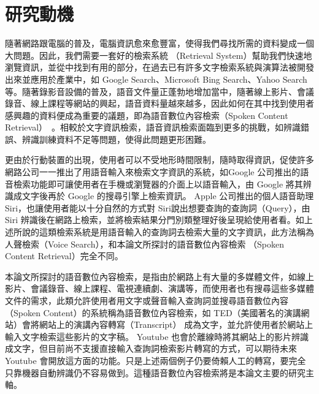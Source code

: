 \section{研究動機}
隨著網路跟電腦的普及，電腦資訊愈來愈豐富，使得我們尋找所需的資料變成一個大問題。因此，我們需要一套好的檢索系統
（Retrieval System）幫助我們快速地瀏覽資訊，並從中找到有用的部分，在過去已有許多文字檢索系統與演算法被開發出來並應用於產業中，如 Google Search、Microsoft Bing Search、Yahoo
Search等。隨著錄影音設備的普及，語音文件量正蓬勃地增加當中，隨著線上影片、會議錄音、線上課程等網站的興起，語音資料量越來越多，因此如何在其中找到使用者感興趣的資料便成為重要的議題，即為語音數位內容檢索（Spoken Content Retrieval）~\cite{chelba2008retrieval, lee2005spoken}。相較於文字資訊檢索，語音資訊檢索面臨到更多的挑戰，如辨識錯誤、辨識訓練資料不足等問題，使得此問題更形困難。

更由於行動裝置的出現，使用者可以不受地形時間限制，隨時取得資訊，促使許多網路公司一一推出了用語音輸入來檢索文字資訊的系統，如Google
公司推出的語音檢索功能即可讓使用者在手機或瀏覽器的介面上以語音輸入，由 Google 將其辨識成文字後再於 Google 的搜尋引擎上檢索資訊。 Apple 公司推出的個人語音助理 Siri，也讓使用者能以十分自然的方式對 Siri說出想要查詢的查詢詞（Query），由 Siri 辨識後在網路上檢索，並將檢索結果分門別類整理好後呈現給使用者看。如上述所說的這類檢索系統是用語音輸入的查詢詞去檢索大量的文字資訊，此方法稱為人聲檢索（Voice
Search），和本論文所探討的語音數位內容檢索 （Spoken Content Retrieval）完全不同。

本論文所探討的語音數位內容檢索，是指由於網路上有大量的多媒體文件，如線上影片、會議錄音、線上課程、電視連續劇、演講等，而使用者也有搜尋這些多媒體文件的需求，此類允許使用者用文字或聲音輸入查詢詞並搜尋語音數位內容（Spoken Content）的系統稱為語音數位內容檢索，如 TED（美國著名的演講網站）會將網站上的演講內容轉寫（Transcript） 成為文字，並允許使用者於網站上輸入文字檢索這些影片的文字稿。 Youtube 也會於離線時將其網站上的影片辨識成文字，但目前尚不支援直接輸入查詢詞檢索影片轉寫的方式，可以期待未來 Youtube 會開放這方面的功能。只是上述兩個例子仍要倚賴人工的轉寫，要完全只靠機器自動辨識仍不容易做到。這種語音數位內容檢索將是本論文主要的研究主軸。

